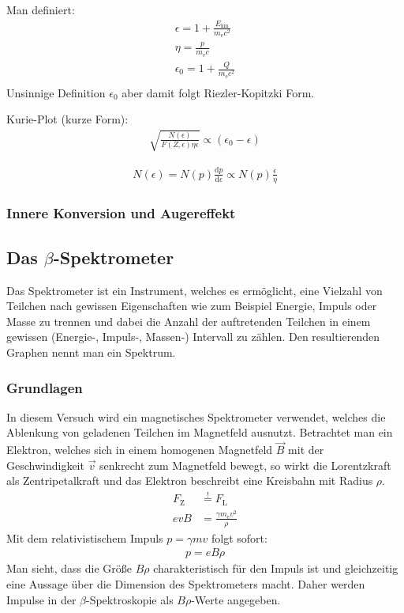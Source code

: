\documentclass[11pt, a4paper]{article}
\numberwithin{equation}{section}
\begin{document}
Man definiert:
\begin{align}
	\epsilon = 1 + \frac{E_\mathrm{kin}}{m_\mathrm{e} c^2} \\
	\eta = \frac{p}{m_\mathrm{e} c} \\
	\epsilon_0 = 1 + \frac{Q}{m_\mathrm{e} c^2} \\
\end{align}
Unsinnige Definition $\epsilon_0$ aber damit folgt Riezler-Kopitzki Form.

Kurie-Plot (kurze Form):
\begin{align}
	\sqrt{\frac{N(\epsilon)}{F(Z,\epsilon) \eta \epsilon}} \propto (\epsilon_0 - \epsilon)
\end{align}

\begin{align}
	N(\epsilon) = N(p) \frac{\mathrm{d}p}{\mathrm{d}\epsilon}\propto N(p) \frac{\epsilon}{\eta}
\end{align}

\subsubsection{Innere Konversion und Augereffekt}

\subsection{Das $\beta$-Spektrometer}
Das Spektrometer ist ein Instrument, welches es ermöglicht, eine Vielzahl von Teilchen nach gewissen Eigenschaften wie zum Beispiel Energie, Impuls oder Masse zu trennen und dabei die Anzahl der auftretenden Teilchen in einem gewissen (Energie-, Impuls-, Massen-) Intervall zu zählen.
Den resultierenden Graphen nennt man ein Spektrum.

\subsubsection{Grundlagen}
In diesem Versuch wird ein magnetisches Spektrometer verwendet, welches die Ablenkung von geladenen Teilchen im Magnetfeld ausnutzt.
Betrachtet man ein Elektron, welches sich in einem homogenen Magnetfeld $\vec{B}$ mit der Geschwindigkeit $\vec{v}$ senkrecht zum Magnetfeld bewegt, so wirkt die Lorentzkraft als Zentripetalkraft und das Elektron beschreibt eine Kreisbahn mit Radius $\rho$.
\begin{align}
	F_\mathrm{Z} &\stackrel{!}{=} F_\mathrm{L} \nonumber\\
	e v B &= \frac{\gamma m_\mathrm{e} v^2}{\rho}
\end{align}
Mit dem relativistischem Impuls $p = \gamma m v$ folgt sofort:
\begin{align}
	p = e B \rho
	\label{eq:impuls_radius}
\end{align}
Man sieht, dass die Größe $B \rho$ charakteristisch für den Impuls ist und gleichzeitig eine Aussage über die Dimension des Spektrometers macht.
Daher werden Impulse in der $\beta$-Spektroskopie als $B \rho$-Werte angegeben.
\end{document}
